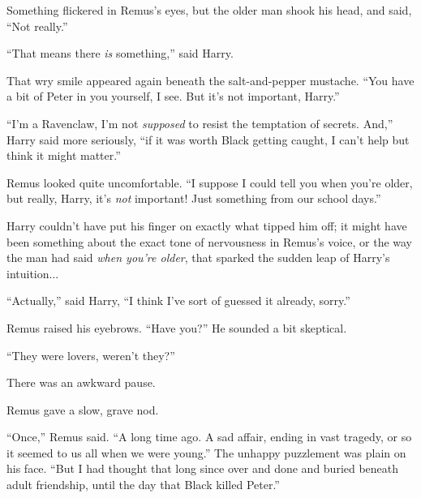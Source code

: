 Something flickered in Remus's eyes, but the older man shook his head, and said, ``Not really.''

``That means there \emph{is} something,'' said Harry.

That wry smile appeared again beneath the salt-and-pepper mustache. ``You have a bit of Peter in you yourself, I see. But it's not important, Harry.''

``I'm a Ravenclaw, I'm not \emph{supposed} to resist the temptation of secrets. And,'' Harry said more seriously, ``if it was worth Black getting caught, I can't help but think it might matter.''

Remus looked quite uncomfortable. ``I suppose I could tell you when you're older, but really, Harry, it's \emph{not} important! Just something from our school days.''

Harry couldn't have put his finger on exactly what tipped him off; it might have been something about the exact tone of nervousness in Remus's voice, or the way the man had said \emph{when you're older}, that sparked the sudden leap of Harry's intuition...

``Actually,'' said Harry, ``I think I've sort of guessed it already, sorry.''

Remus raised his eyebrows. ``Have you?'' He sounded a bit skeptical.

``They were lovers, weren't they?''

There was an awkward pause.

Remus gave a slow, grave nod.

``Once,'' Remus said. ``A long time ago. A sad affair, ending in vast tragedy, or so it seemed to us all when we were young.'' The unhappy puzzlement was plain on his face. ``But I had thought that long since over and done and buried beneath adult friendship, until the day that Black killed Peter.''
